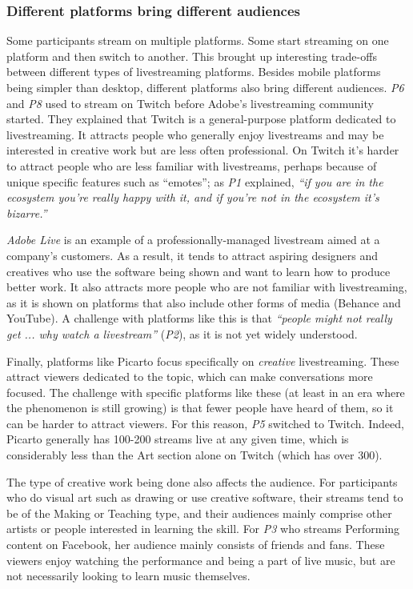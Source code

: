 
\subsubsection{Different platforms bring different audiences}
Some participants stream on multiple platforms. Some start streaming on one platform and then switch to another. This brought up interesting trade-offs between different types of livestreaming platforms. Besides mobile platforms being simpler than desktop, different platforms also bring different audiences. \textit{P6} and \textit{P8} used to stream on Twitch before Adobe's livestreaming community started. They explained that Twitch is a general-purpose platform dedicated to livestreaming. It attracts people who generally enjoy livestreams and may be interested in creative work but are less often professional. On Twitch it's harder to attract people who are less familiar with livestreams, perhaps because of unique specific features such as ``emotes''; as \textit{P1} explained, \textit{``if you are in the ecosystem you're really happy with it, and if you're not in the ecosystem it's bizarre.''}

\textit{Adobe Live} is an example of a professionally-managed live\-stream aimed at a company's customers. As a result, it tends to attract aspiring designers and creatives who use the software being shown and want to learn how to produce better work. It also attracts more people who are not familiar with livestreaming, as it is shown on platforms that also include other forms of media (Behance and YouTube). A challenge with platforms like this is that \textit{``people might not really get ... why watch a livestream''} (\textit{P2}), as it is not yet widely understood.

Finally, platforms like Picarto focus specifically on \textit{creative} livestreaming. These attract viewers dedicated to the topic, which can make conversations more focused. The challenge with specific platforms like these (at least in an era where the phenomenon is still growing) is that fewer people have heard of them, so it can be harder to attract viewers. For this reason, \textit{P5} switched to Twitch. Indeed, Picarto generally has 100-200 streams live at any given time, which is considerably less than the Art section alone on Twitch (which has over 300).

The type of creative work being done also affects the audience. For participants who do visual art such as drawing or use creative software, their streams tend to be of the Making or Teaching type, and their audiences mainly comprise other artists or people interested in learning the skill. For \textit{P3} who streams Performing content on Facebook, her audience mainly consists of friends and fans. These viewers enjoy watching the performance and being a part of live music, but are not necessarily looking to learn music themselves.
 
